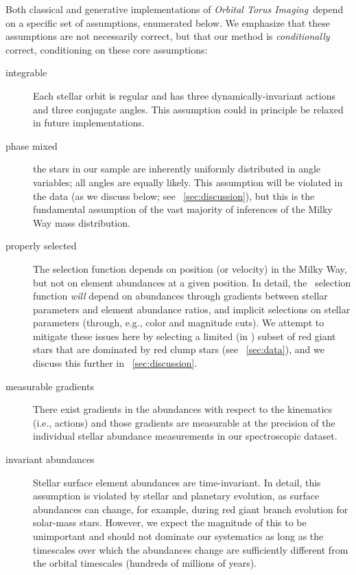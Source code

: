 \documentclass[modern]{aastex63}
\newcommand{\methodname}{\textsl{Orbital Torus Imaging}}
\newcommand{\apogee}{\acronym{APOGEE}}
\begin{document}
Both classical and generative implementations of \methodname\ depend on a
specific set of assumptions, enumerated below.
We emphasize that these assumptions are not necessarily correct, but that our
method is \emph{conditionally} correct, conditioning on these core assumptions:
\begin{description}
\item[integrable] Each stellar orbit is regular and has three
  dynamically-invariant actions and three conjugate angles. This assumption
  could in principle be relaxed in future implementations.
\item[phase mixed]  the stars in our
  sample are inherently uniformly distributed in angle variables; all angles are
  equally likely. This assumption will be violated in the data (as we discuss
  below; see \sectionname~\ref{sec:discussion}), but this is the fundamental
  assumption of the vast majority of inferences of the Milky Way mass
  distribution.
\item[properly selected] The selection function depends on position (or
  velocity) in the Milky Way, but not on element abundances at a given position.
  In detail, the \apogee\ selection function \emph{will} depend on abundances
  through gradients between stellar parameters and element abundance ratios, and
  implicit selections on stellar parameters (through, e.g., color and magnitude
  cuts). We attempt to mitigate these issues here by selecting a limited (in
  \logg) subset of red giant stars that are dominated by red clump stars (see
  \sectionname~\ref{sec:data}), and we discuss this further in
  \sectionname~\ref{sec:discussion}.
\item[measurable gradients] There exist gradients in the abundances with respect
  to the kinematics (i.e., actions) and those gradients are measurable at the
  precision of the individual stellar abundance measurements in our
  spectroscopic dataset.
\item[invariant abundances] Stellar surface element abundances are
  time-invariant. In detail, this assumption is violated by stellar and
  planetary evolution, as surface abundances can change, for example, during red
  giant branch evolution \citep[e.g.,][]{Iben:1965, Martig:2016} for solar-mass
  stars. However, we expect the magnitude of this to be unimportant and should
  not dominate our systematics as long as the timescales over which the
  abundances change are sufficiently different from the orbital timescales
  (hundreds of millions of years).
\end{description}
\end{document}
